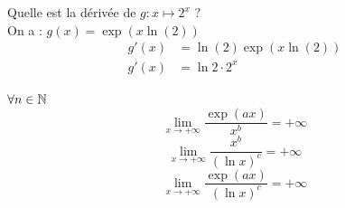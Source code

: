 \begin{exemple}
	Quelle est la dérivée de $g : x \mapsto 2^x$ ? \\
	On a : $g(x) = \exp{(x \ln{(2)})}$
	\begin{align*}
		g'(x) &= \ln{(2)} \exp{(x\ln{(2)})} \\
		g'(x) &= \ln{2} \cdot 2^x
	\end{align*}
\end{exemple}

\begin{graybox}
	\begin{theoreme}
		$\forall n \in \mathbb{N}$
		\[\lim_{x \to +\infty} \frac{\exp{(ax)}}{x^b} = + \infty \]
		\[\lim_{x \to +\infty} \frac{x^b}{(\ln{x})^c} = +\infty\] 
		\[\lim_{x \to +\infty} \frac{\exp{(ax)}}{(\ln{x})^c} = +\infty\]
	\end{theoreme}
\end{graybox}
